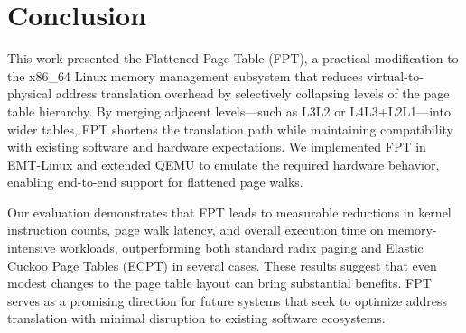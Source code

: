 \section{Conclusion}

This work presented the Flattened Page Table (FPT), a practical modification to the x86\_64 Linux memory management subsystem that reduces virtual-to-physical address translation overhead by selectively collapsing levels of the page table hierarchy. By merging adjacent levels—such as L3L2 or L4L3+L2L1—into wider tables, FPT shortens the translation path while maintaining compatibility with existing software and hardware expectations. We implemented FPT in EMT-Linux and extended QEMU to emulate the required hardware behavior, enabling end-to-end support for flattened page walks.

Our evaluation demonstrates that FPT leads to measurable reductions in kernel instruction counts, page walk latency, and overall execution time on memory-intensive workloads, outperforming both standard radix paging and Elastic Cuckoo Page Tables (ECPT) in several cases. These results suggest that even modest changes to the page table layout can bring substantial benefits. FPT serves as a promising direction for future systems that seek to optimize address translation with minimal disruption to existing software ecosystems.
